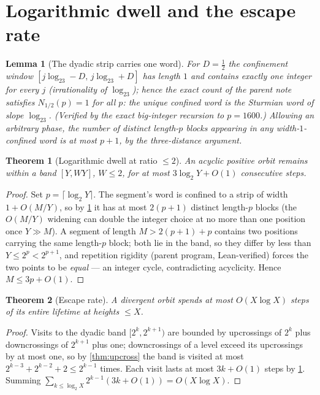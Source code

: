 \documentclass[11pt]{article}
\newtheorem{theorem}{Theorem}
\newtheorem{lemma}{Lemma}
\begin{document}
\section{Logarithmic dwell and the escape rate}

\begin{lemma}[The dyadic strip carries one word]\label{lem:oneword}
For $D=\tfrac12$ the confinement window
$[j\log_23-D,\,j\log_23+D]$ has length $1$ and contains exactly one
integer for every $j$ (irrationality of $\log_23$); hence the exact
count of the parent note satisfies $N_{1/2}(p)=1$ for all $p$: the
unique confined word is the Sturmian word of slope $\log_23$.
(Verified by the exact big-integer recursion to $p=1600$.) Allowing an
arbitrary phase, the number of distinct length-$p$ blocks appearing in
any width-$1$-confined word is at most $p+1$, by the three-distance
argument.
\end{lemma}

\begin{theorem}[Logarithmic dwell at ratio $\le2$]\label{thm:logdwell}
An acyclic positive orbit remains within a band $[Y,WY]$, $W\le2$, for
at most $3\log_2Y+O(1)$ consecutive steps.
\end{theorem}

\begin{proof}
Set $p=\lceil\log_2 Y\rceil$. The segment's word is confined to a strip
of width $1+O(M/Y)$, so by \cref{lem:oneword} it has at most $2(p+1)$
distinct length-$p$ blocks (the $O(M/Y)$ widening can double the
integer choice at no more than one position once $Y\gg M$). A segment
of length $M>2(p+1)+p$ contains two positions carrying the same
length-$p$ block; both lie in the band, so they differ by less than
$Y\le2^{p}<2^{p+1}$, and repetition rigidity (parent program,
Lean-verified) forces the two points to be \emph{equal} --- an integer
cycle, contradicting acyclicity. Hence $M\le3p+O(1)$.
\end{proof}

\begin{theorem}[Escape rate]\label{thm:escape}
A divergent orbit spends at most $O(X\log X)$ steps of its entire
lifetime at heights $\le X$.
\end{theorem}

\begin{proof}
Visits to the dyadic band $[2^k,2^{k+1})$ are bounded by upcrossings of
$2^k$ plus downcrossings of $2^{k+1}$ plus one; downcrossings of a
level exceed its upcrossings by at most one, so by \cref{thm:upcross}
the band is visited at most $2^{k-3}+2^{k-2}+2\le2^{k-1}$ times. Each
visit lasts at most $3k+O(1)$ steps by \cref{thm:logdwell}. Summing
$\sum_{k\le\log_2X}2^{k-1}(3k+O(1))=O(X\log X)$.
\end{proof}
\end{document}
